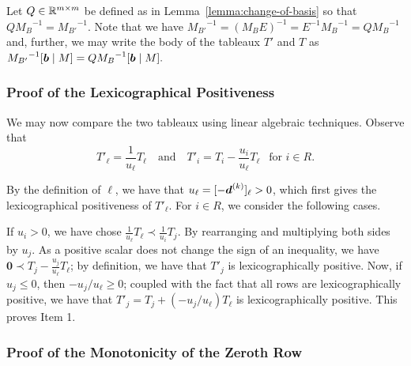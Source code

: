 Let $Q\in \mathbb R^{m\times m}$ be defined as in Lemma~\ref{lemma:change-of-basis} so that $Q {M_{B}}^{-1} = {M_{B'}}^{-1}$. 
Note that we have ${M_{B'}}^{-1} = (M_BE)^{-1} = E^{-1}{M_B}^{-1} = Q {M_B}^{-1}$ and, further, we may write the body of the tableaux $T'$ and $T$ as $ {M_{B'}}^{-1}[{\boldsymbol b}\mid M] = Q{M_{B}}^{-1}[{\boldsymbol b}\mid M]. $ 

\subsubsection{Proof of the Lexicographical Positiveness}

We may now compare the two tableaux using linear algebraic techniques. Observe that 
\[T'_\ell = \frac{1}{u_\ell} T_\ell \quad\text{and}\quad T'_i = T_i - \frac{u_i}{u_\ell} T_\ell~~\text{ for } i \in R. \]

By the definition of $\ell$, we have that $u_{\ell} = [-{\boldsymbol d}^{(k)}]_{\ell} > 0$, which first gives the lexicographical positiveness of $T'_{\ell}$. For $i \in R$, we consider the following cases.  

If $u_i > 0$, we have chose $\frac{1}{u_\ell} T_\ell \prec \frac{1}{u_i} T_j$. By rearranging and multiplying both sides by $u_j$. As a positive scalar does not change the sign of an inequality, we have $\bm0 \prec T_j  - \frac{u_j}{u_\ell}T_\ell$; by definition, we have that $T'_j$ is lexicographically positive. Now, if $u_j \leq 0$, then $-u_j/u_\ell \geq 0$; coupled with the fact that all rows are lexicographically positive, we have that $T'_j = T_j + (-u_j/u_\ell) T_\ell$ is lexicographically positive. This proves Item 1. 

\subsubsection{Proof of the Monotonicity of the Zeroth Row}

